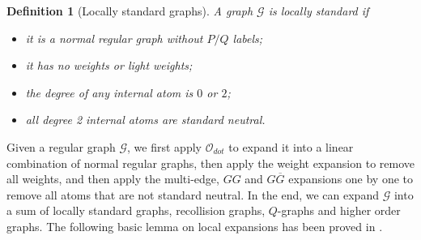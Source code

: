 \documentclass{article}
\newcommand{\1}{\mathds{1}}
\numberwithin{equation}{section}
\renewcommand{\cal}{\mathcal}
\theoremstyle{plain} %
\newtheorem{definition}[theorem]{Definition}
\theoremstyle{remark}
\begin{document}
  

 \begin{definition} [Locally standard graphs] \label{deflvl1} 
	A graph $\cal G$ is  \emph{locally standard}  if 
	\begin{itemize}
		\item[(i)] it is a normal regular graph without $P/Q$ labels; %
		
		
		
		\item[(ii)] it has no weights or light weights;
		
		\item[(iii)] the degree of any internal atom is $0$ or $2$; %
		
		\item[(iv)] all degree 2 internal atoms are standard neutral. %
		
		\end{itemize}
\end{definition}

Given a regular graph $\cal G$, we first apply $\cal O_{dot}$ to expand it into a linear combination of normal regular graphs, then apply the weight expansion to remove all weights, and then apply the multi-edge, $GG$ and $G\overline G$ expansions one by one to remove all atoms that are not standard neutral. In the end, we can expand $\cal G$ into a sum of locally standard graphs, recollision graphs, $Q$-graphs and higher order graphs. The following basic lemma on local expansions has been proved in \cite{PartI_high}.
\end{document}

